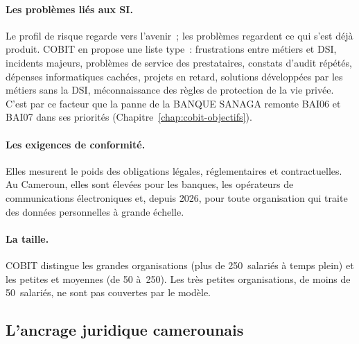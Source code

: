 \paragraph{Les problèmes liés aux SI.} Le profil de risque regarde vers
l'avenir~; les problèmes regardent ce qui s'est déjà produit. COBIT en
propose une liste type~: frustrations entre métiers et DSI, incidents
majeurs, problèmes de service des prestataires, constats d'audit répétés,
dépenses informatiques cachées, projets en retard, solutions développées
par les métiers sans la DSI, méconnaissance des règles de protection de la
vie privée. C'est par ce facteur que la panne de la BANQUE SANAGA remonte
BAI06 et BAI07 dans ses priorités (Chapitre~\ref{chap:cobit-objectifs}).

\paragraph{Les exigences de conformité.} Elles mesurent le poids des
obligations légales, réglementaires et contractuelles. Au Cameroun, elles
sont élevées pour les banques, les opérateurs de communications
électroniques et, depuis 2026, pour toute organisation qui traite des
données personnelles à grande échelle.

\paragraph{La taille.} COBIT distingue les grandes organisations (plus de
250~salariés à temps plein) et les petites et moyennes (de 50 à~250).
Les très petites organisations, de moins de 50~salariés, ne sont pas
couvertes par le modèle.

\subsection{L'ancrage juridique camerounais}

